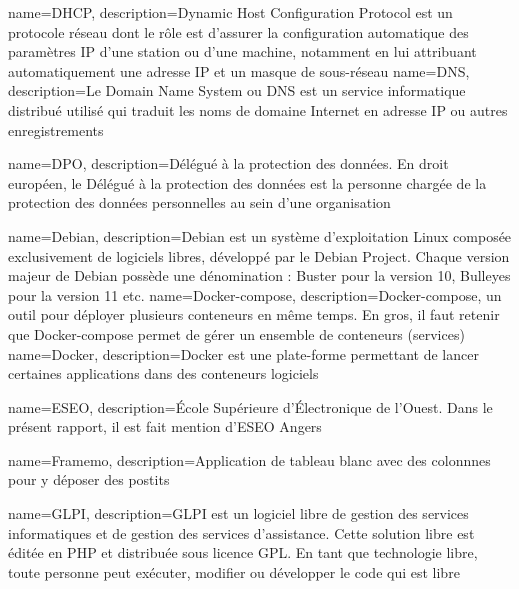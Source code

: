 {
    name=DHCP,
    description={Dynamic Host Configuration Protocol est un protocole réseau dont le rôle est d’assurer la configuration automatique des paramètres IP d’une station ou d'une machine, notamment en lui attribuant automatiquement une adresse IP et un masque de sous-réseau}
}
{
    name=DNS,
    description={Le Domain Name System ou DNS est un service informatique distribué utilisé qui traduit les noms de domaine Internet en adresse IP ou autres enregistrements}
}

{
    name=DPO,
    description={Délégué à la protection des données. En droit européen, le Délégué à la protection des données est la personne chargée de la protection des données personnelles au sein d'une organisation}
}

{
    name=Debian,
    description={Debian est un système d’exploitation Linux composée exclusivement de logiciels libres, développé par le Debian Project. Chaque version majeur de Debian possède une dénomination : Buster pour la version 10, Bulleyes pour la version 11 etc.}
}
{
    name=Docker-compose,
    description={Docker-compose, un outil pour déployer plusieurs conteneurs en même temps. En gros, il faut retenir que Docker-compose permet de gérer un ensemble de conteneurs (services)}
}
{
    name=Docker,
    description={Docker est une plate-forme permettant de lancer certaines applications dans des conteneurs logiciels}
}

{
    name=ESEO,
    description={École Supérieure d'Électronique de l'Ouest. Dans le présent rapport, il est fait mention d'ESEO Angers}
}

{
    name=Framemo,
    description={Application de tableau blanc avec des colonnnes pour y déposer des postits}
}


{
    name=GLPI,
    description={GLPI est un logiciel libre de gestion des services informatiques et de gestion des services d'assistance. Cette solution libre est éditée en PHP et distribuée sous licence GPL. En tant que technologie libre, toute personne peut exécuter, modifier ou développer le code qui est libre}
}

